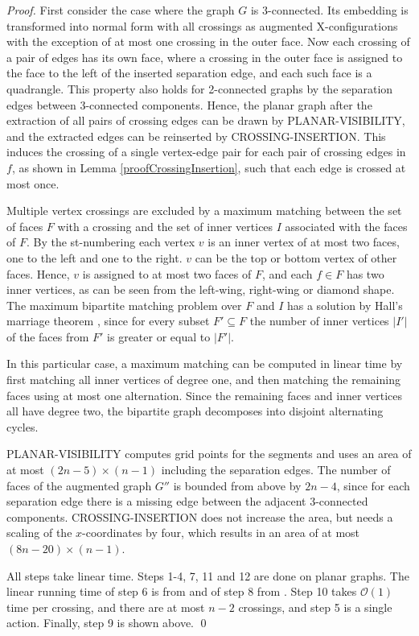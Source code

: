 \documentclass[runningheads]{llncs}
\begin{document}
\begin{proof}
First consider the case where the graph $G$ is 3-connected. Its
embedding is transformed into normal form with all crossings as
augmented X-configurations with the exception of at most one
crossing in the outer face. Now each crossing of a pair of edges has
its own face, where a crossing in the outer face is assigned to the
face to the left of the inserted separation edge, and each such face
is a quadrangle. This property also holds for 2-connected graphs by
the separation edges between 3-connected components. Hence, the
planar graph  after the extraction of all pairs of crossing edges
can be drawn by PLANAR-VISIBILITY, and the extracted edges can be
reinserted by CROSSING-INSERTION. This induces the crossing of a
single vertex-edge pair for each pair of crossing edges in $f$, as
shown in Lemma \ref{proofCrossingInsertion}, such that each edge is
crossed at most once.

Multiple vertex crossings are excluded by a maximum matching between
the set of faces $F$ with a crossing and the set of
 inner vertices $I$ associated with the faces of $F$.
By the st-numbering each vertex  $v$ is an inner vertex  of at most
two faces, one to the left and one to the right. $v$ can be the top
or bottom vertex of  other faces. Hence, $v$ is assigned to at most
two faces of $F$, and each $f \in F$ has two inner vertices, as can
be seen from the left-wing, right-wing or diamond shape. The maximum
bipartite matching problem over $F$ and $I$ has a solution by Hall's
marriage theorem \cite{h-matching-35}, since for every subset $F'
\subseteq F$ the number of inner vertices $|I'|$ of the faces from
$F'$ is greater or equal to $|F'|$.

In this particular case, a maximum matching can be computed in
linear time by first matching all inner vertices of degree one, and
then matching the remaining faces using at most one alternation.
Since the remaining faces and inner vertices all have degree two,
the bipartite graph decomposes into disjoint alternating cycles.

PLANAR-VISIBILITY computes grid points for the segments and uses an
area of at most $(2n-5) \times (n-1)$ including the separation
edges. The number of faces of the augmented graph $G''$ is bounded
from above by $2n-4$, since for each separation edge there is a
missing edge between the adjacent 3-connected components.
CROSSING-INSERTION does not increase the area, but needs a scaling
of the $x$-coordinates by four, which results in an area of at most
$(8n-20) \times (n-1) $.

All steps take linear time. Steps 1-4, 7, 11 and 12 are done on
planar graphs. The linear running time of step 6 is from
\cite{abk-sld3c-13} and of step 8 from
\cite{dett-gdavg-99,rt-rplbopg-86, TT-vrpg-86}. Step 10 takes
$\mathcal{O}(1)$ time per crossing, and there are at most $n-2$
crossings, and step 5 is a single action. Finally, step 9 is shown
above. \qed

\end{proof}
\end{document}
